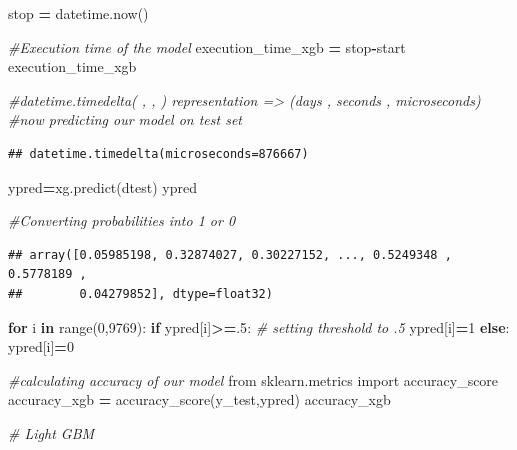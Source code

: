 \documentclass[
]{book}
\newenvironment{Shaded}{\begin{snugshade}}{\end{snugshade}}
\newcommand{\BuiltInTok}[1]{#1}
\newcommand{\CommentTok}[1]{\textcolor[rgb]{0.56,0.35,0.01}{\textit{#1}}}
\newcommand{\ControlFlowTok}[1]{\textcolor[rgb]{0.13,0.29,0.53}{\textbf{#1}}}
\newcommand{\DecValTok}[1]{\textcolor[rgb]{0.00,0.00,0.81}{#1}}
\newcommand{\FloatTok}[1]{\textcolor[rgb]{0.00,0.00,0.81}{#1}}
\newcommand{\ImportTok}[1]{#1}
\newcommand{\KeywordTok}[1]{\textcolor[rgb]{0.13,0.29,0.53}{\textbf{#1}}}
\newcommand{\NormalTok}[1]{#1}
\newcommand{\OperatorTok}[1]{\textcolor[rgb]{0.81,0.36,0.00}{\textbf{#1}}}
\begin{document}
\begin{Shaded}
\begin{Highlighting}[]
\NormalTok{stop }\OperatorTok{=}\NormalTok{ datetime.now()}

\CommentTok{\#Execution time of the model }
\NormalTok{execution\_time\_xgb }\OperatorTok{=}\NormalTok{ stop}\OperatorTok{{-}}\NormalTok{start }
\NormalTok{execution\_time\_xgb}


\CommentTok{\#datetime.timedelta( , , ) representation =\textgreater{} (days , seconds , microseconds) }
\CommentTok{\#now predicting our model on test set }
\end{Highlighting}
\end{Shaded}

\begin{verbatim}
## datetime.timedelta(microseconds=876667)
\end{verbatim}

\begin{Shaded}
\begin{Highlighting}[]
\NormalTok{ypred}\OperatorTok{=}\NormalTok{xg.predict(dtest) }
\NormalTok{ypred}


\CommentTok{\#Converting probabilities into 1 or 0  }
\end{Highlighting}
\end{Shaded}

\begin{verbatim}
## array([0.05985198, 0.32874027, 0.30227152, ..., 0.5249348 , 0.5778189 ,
##        0.04279852], dtype=float32)
\end{verbatim}

\begin{Shaded}
\begin{Highlighting}[]
\ControlFlowTok{for}\NormalTok{ i }\KeywordTok{in} \BuiltInTok{range}\NormalTok{(}\DecValTok{0}\NormalTok{,}\DecValTok{9769}\NormalTok{): }
    \ControlFlowTok{if}\NormalTok{ ypred[i]}\OperatorTok{\textgreater{}=}\FloatTok{.5}\NormalTok{:       }\CommentTok{\# setting threshold to .5 }
\NormalTok{       ypred[i]}\OperatorTok{=}\DecValTok{1} 
    \ControlFlowTok{else}\NormalTok{: }
\NormalTok{       ypred[i]}\OperatorTok{=}\DecValTok{0}  
       
\CommentTok{\#calculating accuracy of our model }
\ImportTok{from}\NormalTok{ sklearn.metrics }\ImportTok{import}\NormalTok{ accuracy\_score }
\NormalTok{accuracy\_xgb }\OperatorTok{=}\NormalTok{ accuracy\_score(y\_test,ypred) }
\NormalTok{accuracy\_xgb}




\CommentTok{\# Light GBM}
\end{Highlighting}
\end{Shaded}
\end{document}
